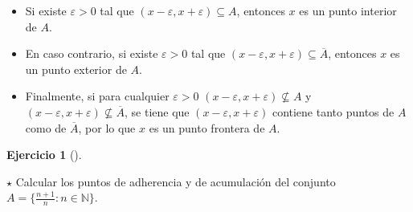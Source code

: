 \documentclass[
  spanish,
  a4paper,
]{scrreport}
\providecommand{\tightlist}{%
  \setlength{\itemsep}{0pt}\setlength{\parskip}{0pt}}
\theoremstyle{definition}
\newtheorem{exercise}{Ejercicio}[chapter]
\theoremstyle{remark}
\begin{document}
\begin{tcolorbox}
\begin{itemize}
\tightlist
\item
  Si existe \(\varepsilon>0\) tal que
  \((x-\varepsilon, x+\varepsilon)\subseteq A\), entonces \(x\) es un
  punto interior de \(A\).
\item
  En caso contrario, si existe \(\varepsilon>0\) tal que
  \((x-\varepsilon, x+\varepsilon)\subseteq \overline{A}\), entonces
  \(x\) es un punto exterior de \(A\).
\item
  Finalmente, si para cualquier \(\varepsilon>0\)
  \((x-\varepsilon, x+\varepsilon)\not\subseteq A\) y
  \((x-\varepsilon, x+\varepsilon)\not\subseteq \overline{A}\), se tiene
  que \((x-\varepsilon, x+\varepsilon)\) contiene tanto puntos de \(A\)
  como de \(\overline{A}\), por lo que \(x\) es un punto frontera de
  \(A\).
\end{itemize}

\end{tcolorbox}

\begin{exercise}[]\protect\hypertarget{exr-particion-interior-exterior-frontera}{}\label{exr-particion-interior-exterior-frontera}

\(\star\) Calcular los puntos de adherencia y de acumulación del
conjunto \(A=\{\frac{n+1}{n}:n\in\mathbb{N}\}\).

\end{exercise}
\end{document}
